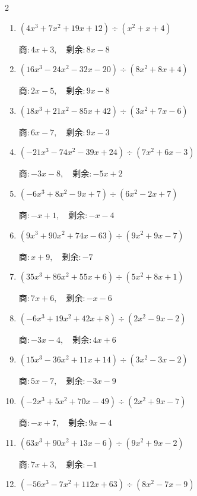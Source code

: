 \begin{multicols}{2}
\begin{enumerate}
  \item $(4x^{3}+7x^{2}+19x+12) \div (x^{2}+x+4)$

        $商 : 4x+3, \quad 剰余 : 8x-8$

  \item $(16x^{3}-24x^{2}-32x-20) \div (8x^{2}+8x+4)$

        $商 : 2x-5, \quad 剰余 : 9x-8$

  \item $(18x^{3}+21x^{2}-85x+42) \div (3x^{2}+7x-6)$

        $商 : 6x-7, \quad 剰余 : 9x-3$

  \item $(-21x^{3}-74x^{2}-39x+24) \div (7x^{2}+6x-3)$

        $商 : -3x-8, \quad 剰余 : -5x+2$

\columnbreak %

\resetques

  \item $(-6x^{3}+8x^{2}-9x+7) \div (6x^{2}-2x+7)$

        $商 : -x+1, \quad 剰余 : -x-4$

  \item $(9x^{3}+90x^{2}+74x-63) \div (9x^{2}+9x-7)$

        $商 : x+9, \quad 剰余 : -7$

  \item $(35x^{3}+86x^{2}+55x+6) \div (5x^{2}+8x+1)$

        $商 : 7x+6, \quad 剰余 : -x-6$

  \item $(-6x^{3}+19x^{2}+42x+8) \div (2x^{2}-9x-2)$

        $商 : -3x-4, \quad 剰余 : 4x+6$

  \item $(15x^{3}-36x^{2}+11x+14) \div (3x^{2}-3x-2)$

        $商 : 5x-7, \quad 剰余 : -3x-9$

\columnbreak %

  \item $(-2x^{3}+5x^{2}+70x-49) \div (2x^{2}+9x-7)$

        $商 : -x+7, \quad 剰余 : 9x-4$

  \item $(63x^{3}+90x^{2}+13x-6) \div (9x^{2}+9x-2)$

        $商 : 7x+3, \quad 剰余 : -1$

  \item $(-56x^{3}-7x^{2}+112x+63) \div (8x^{2}-7x-9)$


\end{enumerate}
\end{multicols}
